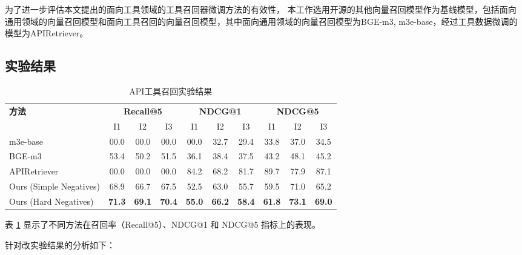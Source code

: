 为了进一步评估本文提出的面向工具领域的工具召回器微调方法的有效性，
本工作选用开源的其他向量召回模型作为基线模型，包括面向
通用领域的向量召回模型和面向工具召回的向量召回模型，其中面向通用领域的向量召回模型为BGE-m3\cite{chen2024bge}, m3e-base\cite{moka2024m3e}，经过工具数据微调的模型为APIRetriever\cite{Qin2023}。

\subsection{实验结果}

\begin{table}[!ht]
  \centering
  \caption{API工具召回实验结果}
  \label{tab:comparison}
  \begin{tabular}{l|ccc|ccc|ccc}
    \toprule
    \textbf{方法} & \multicolumn{3}{c|}{\textbf{Recall@5}} & \multicolumn{3}{c|}{\textbf{NDCG@1}} & \multicolumn{3}{c}{\textbf{NDCG@5}} \\
    & I1 & I2 & I3 & I1 & I2 & I3 & I1 & I2 & I3 \\
    \midrule

    m3e-base            & 00.0 & 00.0 & 00.0 & 00.0 & 32.7 & 29.4 & 33.8 & 37.0 & 34.5 \\
    BGE-m3         & 53.4 & 50.2 & 51.5 & 36.1 & 38.4 & 37.5 & 43.2 & 48.1 & 45.2 \\
    APIRetriever & 00.0 & 00.0 & 00.0 & 84.2 & 68.2 & 81.7 & 89.7 & 77.9 & 87.1 \\
    Ours (Simple Negatives)   & 68.9 & 66.7 & 67.5 & 52.5 & 63.0 & 55.7 & 59.5 & 71.0 & 65.2 \\
    Ours (Hard Negatives)     & \textbf{71.3} & \textbf{69.1} & \textbf{70.4} & \textbf{55.0} & \textbf{66.2} & \textbf{58.4} & \textbf{61.8} & \textbf{73.1} & \textbf{69.0} \\ 
    \bottomrule
  \end{tabular}
\end{table}

表 \ref{tab:comparison} 显示了不同方法在召回率（Recall@5）、NDCG@1 和 NDCG@5 指标上的表现。

针对改实验结果的分析如下：

